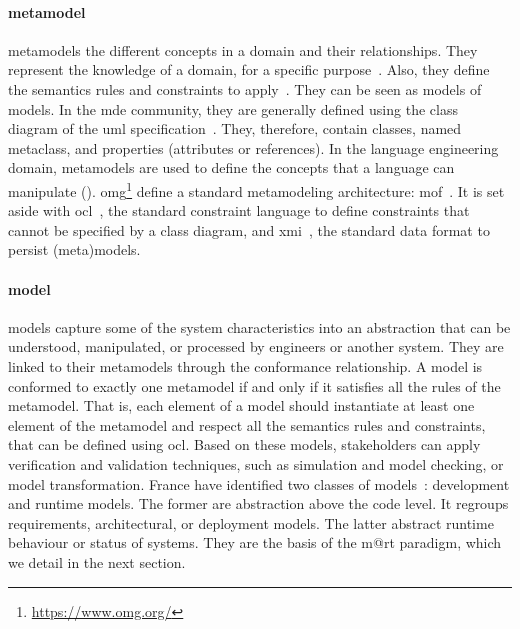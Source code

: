 \paragraph{\Gls{metamodel}}
\Glspl{metamodel} the different concepts in a domain and their relationships.
They represent the knowledge of a domain, for a specific purpose~\cite{DBLP:conf/iceccs/BezivinJT05}.
Also, they define the semantics rules and constraints to apply~\cite{DBLP:journals/computer/Schmidt06}.
They can be seen as \glspl{model} of \glspl{model}.
In the \gls{mde} community, they are generally defined using the class diagram of the \gls{uml} specification~\cite{omg2017umlspec}.
They, therefore, contain classes, named metaclass, and properties (attributes or references).
In the language engineering domain, \glspl{metamodel} are used to define the concepts that a language can manipulate (\cf {}).
\gls{omg}\footnote{\url{https://www.omg.org/}} define a standard metamodeling architecture: \gls{mof}~\cite{MOF:Spec}.
It is set aside with \gls{ocl}~\cite{OCL:Spec}, the standard constraint language to define constraints that cannot be specified by a class diagram, and \gls{xmi}~\cite{XMI:Spec}, the standard data format to persist (meta)\glspl{model}. 

\paragraph{\Gls{model}}
\Glspl{model} capture some of the system characteristics into an abstraction that can be understood, manipulated, or processed by engineers or another system.
They are linked to their \glspl{metamodel} through the conformance relationship.
A \gls{model} is conformed to exactly one \gls{metamodel} if and only if it satisfies all the rules of the \gls{metamodel}.
That is, each element of a \gls{model} should instantiate at least one element of the \gls{metamodel} and respect all the semantics rules and constraints, that can be defined using \gls{ocl}.
Based on these models, stakeholders can apply verification and validation techniques, such as simulation and model checking, or model transformation.
France \etal have identified two classes of models~\cite{DBLP:conf/icse/FranceR07}: development and runtime models.
The former are abstraction above the code level.
It regroups requirements, architectural, or deployment models.
The latter abstract runtime behaviour or status of systems. 
They are the basis of the \gls{m@rt} paradigm, which we detail in the next section.

